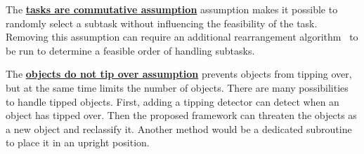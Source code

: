 The \hyperref[assumption:order_does_not_matter]{\textbf{tasks are commutative assumption}} assumption makes it possible to randomly select a subtask without influencing the feasibility of the task. Removing this assumption can require an additional rearrangement algorithm~\cite{krontiris_dealing_2015} to be run to determine a feasible order of handling subtasks.\bs

The \hyperref[assumption:no_tipping]{\textbf{objects do not tip over assumption}} prevents objects from tipping over, but at the same time limits the number of objects. There are many possibilities to handle tipped objects. First, adding a tipping detector can detect when an object has tipped over. Then the proposed framework can threaten the objects as a new object and reclassify it. Another method would be a dedicated subroutine to place it in an upright position.\bs

%

